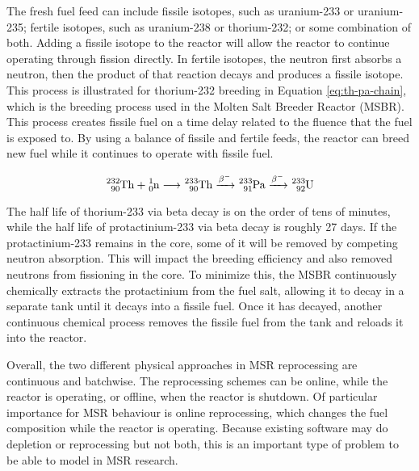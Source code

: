 The fresh fuel feed can include fissile isotopes, such as uranium-233 or uranium-235; fertile isotopes, such as uranium-238 or thorium-232; or some combination of both.
Adding a fissile isotope to the reactor will allow the reactor to continue operating through fission directly.
In fertile isotopes, the neutron first absorbs a neutron, then the product of that reaction decays and produces a fissile isotope. This process is illustrated for thorium-232 breeding in Equation \eqref{eq:th-pa-chain}, which is the breeding process used in the Molten Salt Breeder Reactor (MSBR).
This process creates fissile fuel on a time delay related to the fluence that the fuel is exposed to.
By using a balance of fissile and fertile feeds, the reactor can breed new fuel while it continues to operate with fissile fuel.

\begin{equation} \hfill
\ce{^{232}_{90}Th} + \ce{^{1}_{0}n} \longrightarrow \ce{^{233}_{90}Th} \xrightarrow{\beta^-} \ce{^{233}_{91}Pa} \xrightarrow{\beta^-} \ce{^{233}_{92}U}
\hfill\label{eq:th-pa-chain} \end{equation}

The half life of thorium-233 via beta decay is on the order of tens of minutes, while the half life of protactinium-233 via beta decay is roughly 27 days.
If the protactinium-233 remains in the core, some of it will be removed by competing neutron absorption.
This will impact the breeding efficiency and also removed neutrons from fissioning in the core.
To minimize this, the MSBR continuously chemically extracts the protactinium from the fuel salt, allowing it to decay in a separate tank until it decays into a fissile fuel.
Once it has decayed, another continuous chemical process removes the fissile fuel from the tank and reloads it into the reactor.

Overall, the two different physical approaches in MSR reprocessing are continuous and batchwise. The reprocessing schemes can be online, while the reactor is operating, or offline, when the reactor is shutdown. Of particular importance for MSR behaviour is online reprocessing, which changes the fuel composition while the reactor is operating.
Because existing software may do depletion or reprocessing but not both, this is an important type of problem to be able to model in MSR research.


